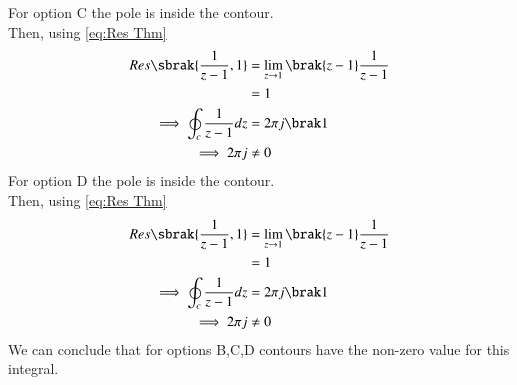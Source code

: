\documentclass[journal,12pt,twocolumn]{IEEEtran}
\theoremstyle{remark}
\begin{document}
For option C the pole is inside the contour.\\
Then, using \eqref{eq:Res Thm}
\begin{align}
Res\sbrak{\frac{1}{z-1},1} &=\lim_{z\to 1}\brak{z-1}\frac{1}{z-1}\\
&=1\\
\implies \oint_{c}\frac{1}{z-1}dz&=2\pi j\brak 1\\
\implies 2\pi j&\neq 0
\end{align}
For option D the pole is inside the contour.\\
Then, using \eqref{eq:Res Thm}
\begin{align}
Res\sbrak{\frac{1}{z-1},1} &=\lim_{z\to 1}\brak{z-1}\frac{1}{z-1}\\
&=1\\
\implies \oint_{c}\frac{1}{z-1}dz&=2\pi j\brak 1\\
\implies 2\pi j&\neq 0
\end{align}
We can conclude that for options B,C,D contours have the non-zero value for this integral.
\end{document}

